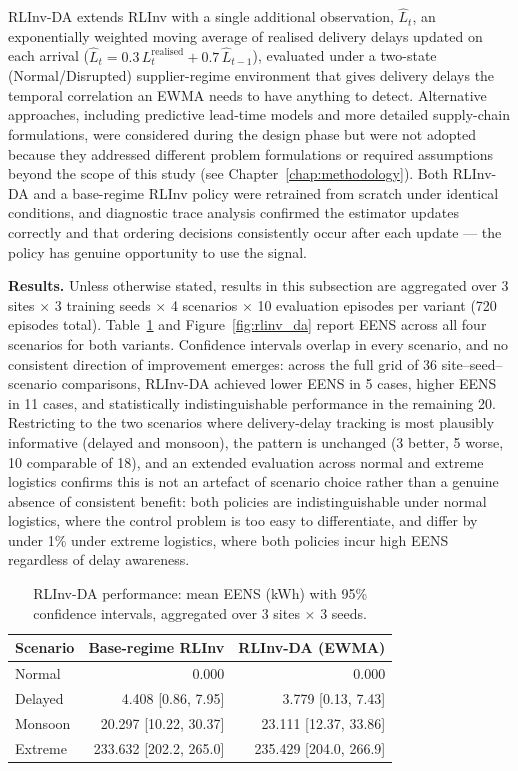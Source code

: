 RLInv-DA extends RLInv with a single additional observation,
$\widehat{L}_t$, an exponentially weighted moving average of realised
delivery delays updated on each arrival ($\widehat{L}_t = 0.3\,
L_t^{\mathrm{realised}} + 0.7\, \widehat{L}_{t-1}$), evaluated under a
two-state (Normal/Disrupted) supplier-regime environment that gives
delivery delays the temporal correlation an EWMA needs to have
anything to detect. Alternative approaches, including predictive
lead-time models and more detailed supply-chain formulations, were
considered during the design phase but were not adopted because they
addressed different problem formulations or required assumptions
beyond the scope of this study (see Chapter~\ref{chap:methodology}).
Both RLInv-DA and a base-regime RLInv policy were
retrained from scratch under identical conditions, and diagnostic
trace analysis confirmed the estimator updates correctly and that
ordering decisions consistently occur after each update --- the policy
has genuine opportunity to use the signal.

\textbf{Results.} Unless otherwise stated, results in this subsection
are aggregated over 3 sites $\times$ 3 training seeds $\times$ 4
scenarios $\times$ 10 evaluation episodes per variant (720 episodes
total). Table~\ref{tab:rlinv_da_results} and Figure~\ref{fig:rlinv_da} report EENS across
all four scenarios for both variants. Confidence intervals overlap in every scenario, and no
consistent direction of improvement emerges: across the full grid of
36 site--seed--scenario comparisons, RLInv-DA achieved lower EENS in 5
cases, higher EENS in 11 cases, and statistically indistinguishable
performance in the remaining 20. Restricting to the two scenarios
where delivery-delay tracking is most plausibly informative (delayed
and monsoon), the pattern is unchanged (3 better, 5 worse, 10
comparable of 18), and an extended evaluation across normal and
extreme logistics confirms this is not an artefact of scenario choice
rather than a genuine absence of consistent benefit: both policies are
indistinguishable under normal logistics, where the control problem is
too easy to differentiate, and differ by under 1\% under extreme
logistics, where both policies incur high EENS regardless of delay
awareness.

\begin{table}[htb]
\centering
\caption{RLInv-DA performance: mean EENS (kWh) with 95\% confidence
intervals, aggregated over 3 sites $\times$ 3 seeds.}
\label{tab:rlinv_da_results}
\begin{tabular}{lrr}
\toprule
Scenario & Base-regime RLInv & RLInv-DA (EWMA) \\
\midrule
Normal & 0.000 & 0.000 \\
Delayed & 4.408 [0.86, 7.95] & 3.779 [0.13, 7.43] \\
Monsoon & 20.297 [10.22, 30.37] & 23.111 [12.37, 33.86] \\
Extreme & 233.632 [202.2, 265.0] & 235.429 [204.0, 266.9] \\
\bottomrule
\end{tabular}
\end{table}

